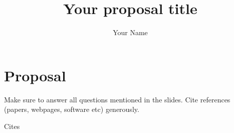 \documentclass[11pt, a4paper]{article}
\title{Your proposal title}
\author{Your Name}
\date{}
\begin{document}
\maketitle

\section{Proposal}
Make sure to answer all questions mentioned in the slides.
Cite references (papers, webpages, software etc) generously.

Cites~\cite{einstein}

\printbibliography
\end{document}
